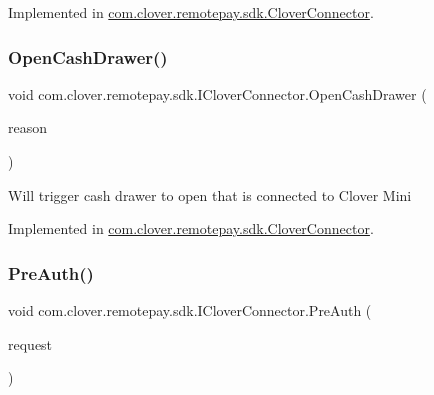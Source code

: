 Implemented in \hyperlink{classcom_1_1clover_1_1remotepay_1_1sdk_1_1_clover_connector_a0ecc7e8c3333a05853297c46adc8822c}{com.\+clover.\+remotepay.\+sdk.\+Clover\+Connector}.

\mbox{\label{interfacecom_1_1clover_1_1remotepay_1_1sdk_1_1_i_clover_connector_a0fc361c449dc63eab061ca6866124deb}} 
\subsubsection{\texorpdfstring{Open\+Cash\+Drawer()}{OpenCashDrawer()}}
{\footnotesize\ttfamily void com.\+clover.\+remotepay.\+sdk.\+I\+Clover\+Connector.\+Open\+Cash\+Drawer (\begin{DoxyParamCaption}\item[{String}]{reason }\end{DoxyParamCaption})}



Will trigger cash drawer to open that is connected to Clover Mini 



Implemented in \hyperlink{classcom_1_1clover_1_1remotepay_1_1sdk_1_1_clover_connector_aeeba2f27e901c6f105dbd9cdc624bd2c}{com.\+clover.\+remotepay.\+sdk.\+Clover\+Connector}.

\mbox{\label{interfacecom_1_1clover_1_1remotepay_1_1sdk_1_1_i_clover_connector_aa41978ea2b8048ff23ab931752129eb9}} 
\subsubsection{\texorpdfstring{Pre\+Auth()}{PreAuth()}}
{\footnotesize\ttfamily void com.\+clover.\+remotepay.\+sdk.\+I\+Clover\+Connector.\+Pre\+Auth (\begin{DoxyParamCaption}\item[{\hyperlink{classcom_1_1clover_1_1remotepay_1_1sdk_1_1_pre_auth_request}{Pre\+Auth\+Request}}]{request }\end{DoxyParamCaption})}



